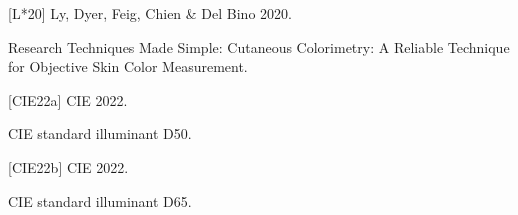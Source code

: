 \documentclass[letterpaper,10pt,english]{sphinxmanual}
\begin{document}
\begin{DUlineblock}{0em}
\item[] {[}L*20{]} Ly, Dyer, Feig, Chien \& Del Bino 2020.
\item[] Research Techniques Made Simple: Cutaneous Colorimetry: A Reliable Technique for Objective Skin Color Measurement.
\item[] 
\end{DUlineblock}

\begin{DUlineblock}{0em}
\item[] {[}CIE22a{]} CIE 2022.
\item[] CIE standard illuminant D50.
\item[] 
\end{DUlineblock}

\begin{DUlineblock}{0em}
\item[] {[}CIE22b{]} CIE 2022.
\item[] CIE standard illuminant D65.
\item[] 
\end{DUlineblock}
\end{document}
